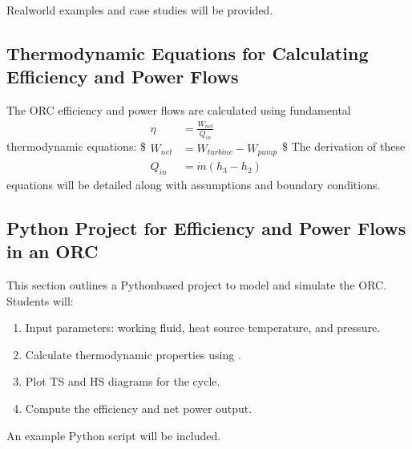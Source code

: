 \documentclass[letterpaper,10pt,english]{jupyterBook}
\begin{document}
\sphinxAtStartPar
Real\sphinxhyphen{}world examples and case studies will be provided.


\subsection{Thermodynamic Equations for Calculating Efficiency and Power Flows}
\label{\detokenize{ProjectInstructions:thermodynamic-equations-for-calculating-efficiency-and-power-flows}}
\sphinxAtStartPar
The ORC efficiency and power flows are calculated using fundamental
thermodynamic equations: \$\(\begin{aligned}
    \eta &= \frac{W_{net}}{Q_{in}} \\
    W_{net} &= W_{turbine} - W_{pump} \\
    Q_{in} &= \dot{m}(h_3 - h_2)
\end{aligned}\)\$ The derivation of these equations will be detailed along
with assumptions and boundary conditions.


\subsection{Python Project for Efficiency and Power Flows in an ORC}
\label{\detokenize{ProjectInstructions:python-project-for-efficiency-and-power-flows-in-an-orc}}
\sphinxAtStartPar
This section outlines a Python\sphinxhyphen{}based project to model and simulate the
ORC. Students will:
\begin{enumerate}
%
\item {} 
\sphinxAtStartPar
Input parameters: working fluid, heat source temperature, and
pressure.

\item {} 
\sphinxAtStartPar
Calculate thermodynamic properties using .

\item {} 
\sphinxAtStartPar
Plot T\sphinxhyphen{}S and H\sphinxhyphen{}S diagrams for the cycle.

\item {} 
\sphinxAtStartPar
Compute the efficiency and net power output.

\end{enumerate}

\sphinxAtStartPar
An example Python script will be included.
\end{document}
